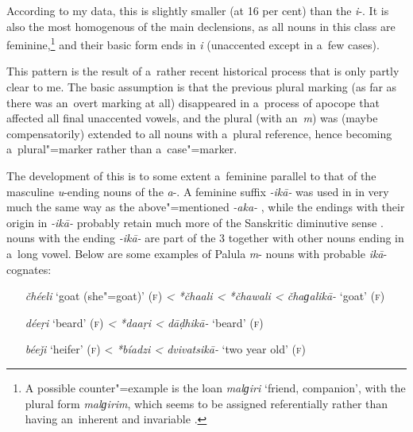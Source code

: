 According to my data, this  is slightly smaller (at 16 per cent) than the \textit{i}-. It is also the most homogenous of the main declensions, as all nouns in this class are feminine,\footnote{A possible counter"=example is the  loan \textit{malɡiri} `friend, companion', with the plural form \textit{malɡirim}, which seems to be assigned  referentially rather than having an~inherent and invariable .} and their basic form ends in \textit{i} (unaccented except in a~few cases).


This pattern is the result of a~rather recent historical process that is only partly clear to me. The basic assumption is that the previous plural marking (as far as there was an~overt marking at all) disappeared in a~process of apocope that affected all final unaccented vowels, and the plural  (with an~\textit{m}) was (maybe compensatorily) extended to all nouns with a~plural reference, hence becoming a~plural"=marker rather than a~case"=marker.


The development of this  is to some extent a~feminine parallel to that of the masculine \textit{u}-ending nouns of the \textit{a}-. A feminine  suffix \textit{-ikā-} was used in  in very much the same way as the above"=mentioned \textit{-aka-} \citep[1222]{whitney1960}, while the  endings with their origin in \textit{-ikā-} probably retain much more of the Sanskritic diminutive sense \citep[222]{masica1991}.  nouns with the ending \textit{-ikā-} are part of the   3 together with other nouns ending in a~long vowel. Below are some examples of Palula \textit{m}- nouns with probable  \textit{ikā}-cognates: 


\begin{itemize}[leftmargin=]
\item[\textit{čhéeli} `goat (she"=goat)' (\textsc{f})] \textit{{\textless} *čhaali {\textless} *čhawali {\textless} čhaɡalikā-} `goat' (\textsc{f})
\item[\textit{déeṛi} `beard' (\textsc{f})] \textit{{\textless} *daaṛi {\textless} dāḍhikā-} `beard' (\textsc{f})
\item[\textit{béeǰi} `heifer' (\textsc{f})] {\textless} \textit{*bíadzi {\textless} dvivatsikā-} `two year old' (\textsc{f})
\end{itemize}

